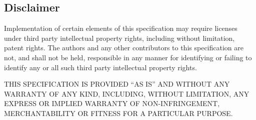     \subsection{Disclaimer}
    Implementation of certain elements of this specification may require licenses under third party intellectual 
    property rights, including without limitation, patent rights. The authors and any other contributors to this 
    specification are not, and shall not be held, responsible in any manner for identifying or failing to identify 
    any or all such third party intellectual property rights.    
    
    \medskip
    THIS SPECIFICATION IS PROVIDED “AS IS” AND WITHOUT ANY WARRANTY OF ANY KIND, INCLUDING, WITHOUT LIMITATION,
    ANY EXPRESS OR IMPLIED WARRANTY OF NON-INFRINGEMENT, MERCHANTABILITY OR FITNESS FOR A PARTICULAR PURPOSE.
